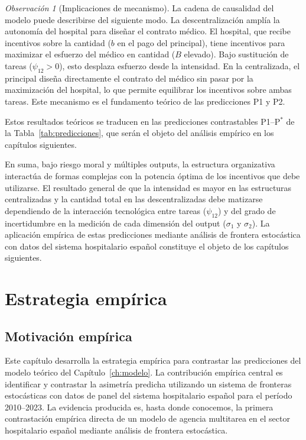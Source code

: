 \documentclass[12pt, a4paper, twoside, openright]{book}
\theoremstyle{plain}
\theoremstyle{definition}
\theoremstyle{remark}
\newtheorem{remark}{Observación}[chapter]
\begin{document}
\begin{remark}[Implicaciones de mecanismo]
La cadena de causalidad del modelo puede describirse del siguiente modo. La descentralización amplía la autonomía del hospital para diseñar el contrato médico. El hospital, que recibe incentivos sobre la cantidad ($b$ en el pago del principal), tiene incentivos para maximizar el esfuerzo del médico en cantidad ($B$ elevado). Bajo sustitución de tareas ($\psi_{12}>0$), esto desplaza esfuerzo desde la intensidad. En la centralizada, el principal diseña directamente el contrato del médico sin pasar por la maximización del hospital, lo que permite equilibrar los incentivos sobre ambas tareas. Este mecanismo es el fundamento teórico de las predicciones P1 y P2.
\end{remark}

Estos resultados teóricos se traducen en las predicciones contrastables P1--P$^*$ de la Tabla~\ref{tab:predicciones}, que serán el objeto del análisis empírico en los capítulos siguientes.

En suma, bajo riesgo moral y múltiples outputs, la estructura organizativa interactúa de formas complejas con la potencia óptima de los incentivos que debe utilizarse. El resultado general de que la intensidad es mayor en las estructuras centralizadas y la cantidad total en las descentralizadas debe matizarse dependiendo de la interacción tecnológica entre tareas ($\psi_{12}$) y del grado de incertidumbre en la medición de cada dimensión del output ($\sigma_1$ y $\sigma_2$). La aplicación empírica de estas predicciones mediante análisis de frontera estocástica con datos del sistema hospitalario español constituye el objeto de los capítulos siguientes.



\chapter{Estrategia empírica}
\label{ch:estrategia}

\section{Motivación empírica}

Este capítulo desarrolla la estrategia empírica para contrastar las predicciones del modelo teórico del Capítulo~\ref{ch:modelo}. La contribución empírica central es identificar y contrastar la asimetría predicha utilizando un sistema de fronteras estocásticas con datos de panel del sistema hospitalario español para el período 2010--2023. La evidencia producida es, hasta donde conocemos, la primera contrastación empírica directa de un modelo de agencia multitarea en el sector hospitalario español mediante análisis de frontera estocástica.
\end{document}
